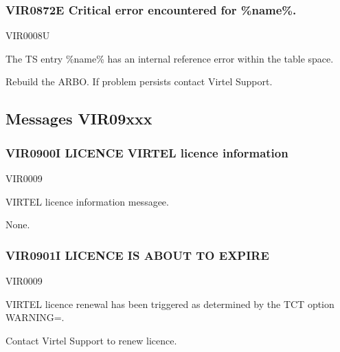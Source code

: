\documentclass[letterpaper,10pt,english]{sphinxmanual}
\begin{document}
\subsubsection{VIR0872E Critical error encountered for \%name\%.}
\label{\detokenize{messages:vir0872e-critical-error-encountered-for-name}}\begin{description}
\sphinxAtStartPar
VIR0008U

\sphinxAtStartPar
The TS entry \%name\% has an internal reference error within the table space.

\sphinxAtStartPar
Rebuild the ARBO. If problem persists contact Virtel Support.

\end{description}


\subsection{Messages VIR09xxx}
\label{\detokenize{messages:messages-vir09xxx}}

\subsubsection{VIR0900I LICENCE VIRTEL licence information}
\label{\detokenize{messages:vir0900i-licence-virtel-licence-information}}\begin{description}
\sphinxAtStartPar
VIR0009

\sphinxAtStartPar
VIRTEL licence information messagee.

\sphinxAtStartPar
None.

\end{description}


\subsubsection{VIR0901I LICENCE IS ABOUT TO EXPIRE}
\label{\detokenize{messages:vir0901i-licence-is-about-to-expire}}\begin{description}
\sphinxAtStartPar
VIR0009

\sphinxAtStartPar
VIRTEL licence renewal has been triggered as determined by the TCT option WARNING=.

\sphinxAtStartPar
Contact Virtel Support to renew licence.

\end{description}
\end{document}
